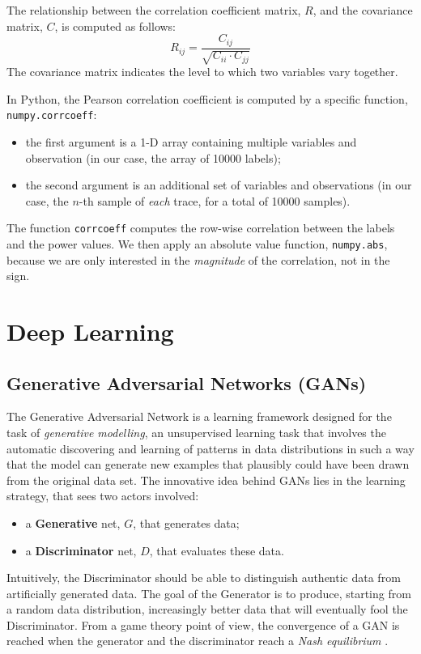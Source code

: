 \documentclass[12pt,a4paper]{book}
\theoremstyle{definition}
\begin{document}
	The relationship between the correlation coefficient matrix, $R$, and the covariance matrix, $C$, is computed as follows:
	\[
	R_{ij} = \frac{C_{ij}}{\sqrt{C_{ii} \cdot C_{jj}}}
	\]
	The covariance matrix indicates the level to which two variables vary together.
	
	In Python, the Pearson correlation coefficient is computed by a specific function,  \texttt{numpy.corrcoeff}: 
	\begin{itemize}
		\item the first argument is a 1-D array containing multiple variables and observation (in our case, the array of 10000 labels);
		\item the second argument is an additional set of variables and observations (in our case, the $n$-th sample of \textit{each} trace, for a total of 10000 samples).
	\end{itemize}
	The function \texttt{corrcoeff} computes the row-wise correlation between the labels and the power values. We then apply an absolute value function, \texttt{numpy.abs}, because we are only interested in the \textit{magnitude} of the correlation, not in the sign.
	
	\chapter{Deep Learning}\label{appendix:dl}
	\section{Generative Adversarial Networks (GANs)}
	The Generative Adversarial Network \cite{Goodfellow2014} is a learning framework designed for the task of \textit{generative modelling}, an unsupervised learning task that involves the automatic discovering and learning of patterns in data distributions in such a way that the model can generate new examples that plausibly could have been drawn from the original data set. The innovative idea behind GANs lies in the learning strategy, that sees two actors involved:
	\begin{itemize}
		\item a \textbf{Generative} net, $G$, that generates data;
		\item a \textbf{Discriminator} net, $D$, that evaluates these data.
	\end{itemize}
	Intuitively, the Discriminator should be able to distinguish authentic data from artificially generated data. The goal of the Generator is to produce, starting from a random data distribution, increasingly better data that will eventually fool the Discriminator. From a game theory point of view, the convergence of a GAN is reached when the generator and the discriminator reach a \textit{Nash equilibrium} \cite{Ratliff2013}.
\end{document}
